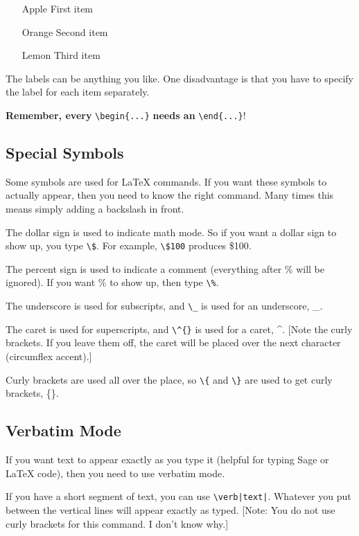 \documentclass[12pt]{article}
\begin{document}
\begin{itemize}
\item[Apple] First item
\item[Orange] Second item
\item[Lemon] Third item
\end{itemize}

The labels can be anything you like. One disadvantage is that you have to specify the label for each item separately.

\vspace{12pt}

\textbf{Remember, every} \verb|\begin{...}| \textbf{needs an} \verb|\end{...}|!

\subsection{Special Symbols}

Some symbols are used for \LaTeX{} commands. If you want these symbols to actually appear, then you need to know the right command. Many times this means simply adding a backslash in front.

The dollar sign is used to indicate math mode. So if you want a dollar sign to show up, you type \verb|\$|. For example, \verb|\$100| produces \$100.

The percent sign is used to indicate a comment (everything after \% will be ignored). If you want \% to show up, then type \verb|\%|.

The underscore is used for subscripts, and \verb|\_| is used for an underscore, \_.

The caret is used for superscripts, and \verb|\^{}| is used for a caret, \^{}. [Note the curly brackets. If you leave them off, the caret will be placed over the next character (circumflex accent).]

Curly brackets are used all over the place, so \verb|\{| and \verb|\}| are used to get curly brackets, \{\}.

\subsection{Verbatim Mode}

If you want text to appear exactly as you type it (helpful for typing Sage or \LaTeX{} code), then you need to use verbatim mode.

If you have a short segment of text, you can use \verb/\verb|text|/. Whatever you put between the vertical lines will appear exactly as typed. [Note: You do not use curly brackets for this command. I don't know why.]
\end{document}
